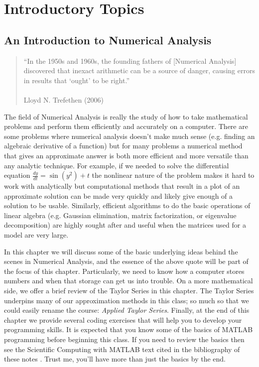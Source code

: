 \chapter{Introductory Topics}

\section{An Introduction to Numerical Analysis}
\begin{quote}
    ``In the 1950s and 1960s, the founding fathers of [Numerical Analysis] discovered that
    inexact arithmetic can be a source of danger, causing errors in results that `ought'
    to be right.'' \\
    \\ Lloyd N. Trefethen (2006)
\end{quote}

The field of Numerical Analysis is really the study of how to take
mathematical problems and perform them efficiently and accurately on a computer.  There
are some problems where numerical analysis doesn't make much sense (e.g. finding an
algebraic derivative of a function) but for many problems a numerical method that gives an
approximate answer is both more efficient and more versatile than any analytic technique.
For example, if we needed to solve the differential equation $\frac{dy}{dt} = \sin(y^2) +
t$ the nonlinear nature of the problem makes it hard to work with analytically but
computational methods that result in a plot of an approximate solution can be made very
quickly and likely give enough of a solution to be usable.  Similarly, efficient
algorithms to do the basic operations of linear algebra (e.g. Gaussian elimination, matrix
factorization, or eigenvalue decomposition) are highly sought after and useful when
the matrices used for a model are very large. 

In this chapter we will discuss some of the basic underlying ideas behind the scenes in
Numerical Analysis, and the essence of the  above quote will be part of the focus of this chapter.
Particularly, we need to know how a computer stores numbers and when that storage can get
us into trouble.  On a more mathematical side, we offer a brief review of the Taylor
Series in this chapter. The Taylor Series underpins many of our approximation methods in
this class; so much so that we could easily rename the course: {\it Applied Taylor
Series}.  Finally, at the end of this chapter we provide several coding exercises that
will help you to develop your programming skills.  It is expected that you know some of
the basics of MATLAB programming before beginning this class.  If you need to review the
basics then see the Scientific Computing with MATLAB text cited in the bibliography of
these notes \cite{SciCompMATLAB}.  Trust me, you'll have more
than just the basics by the end.

